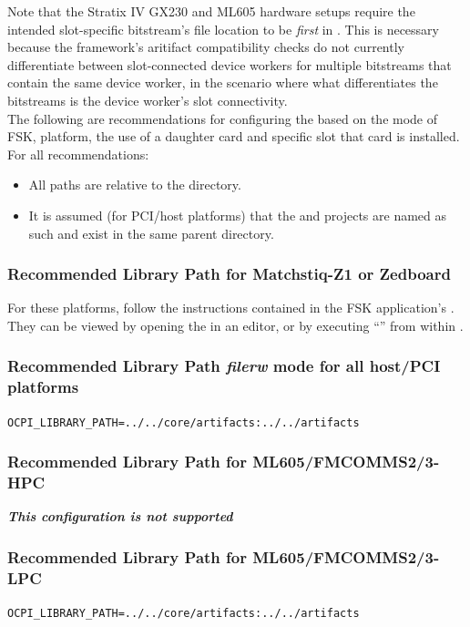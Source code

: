 Note that the Stratix IV GX230 and ML605 hardware setups require the intended slot-specific bitstream's file location to be \textit{first} in .
 This is necessary because the framework's aritifact compatibility checks do not currently differentiate between slot-connected device workers for multiple bitstreams that contain the same device worker, in the scenario where what differentiates the bitstreams is the device worker's slot connectivity. \\

The following are recommendations for configuring the  based on the mode of FSK, platform, the use of a daughter card and specific slot that card is installed. For all recommendations:
\begin{itemize}
  \item All paths are relative to the  directory.
  \item It is assumed (for PCI/host platforms) that the  and  projects are named as such and exist in the same parent directory.
\end{itemize}

\subsubsection{Recommended Library Path for Matchstiq-Z1 or Zedboard}
For these platforms, follow the instructions contained in the FSK application's . They can be viewed by opening the  in an editor, or by executing ``'' from within .

\subsubsection{Recommended Library Path \textit{filerw} mode for all host/PCI platforms}
\verb|OCPI_LIBRARY_PATH=../../core/artifacts:../../artifacts|

\subsubsection{Recommended Library Path for ML605/FMCOMMS2/3-HPC}
\textbf{\textit{This configuration is not supported}}

\subsubsection{Recommended Library Path for ML605/FMCOMMS2/3-LPC}
\verb|OCPI_LIBRARY_PATH=../../core/artifacts:../../artifacts|

